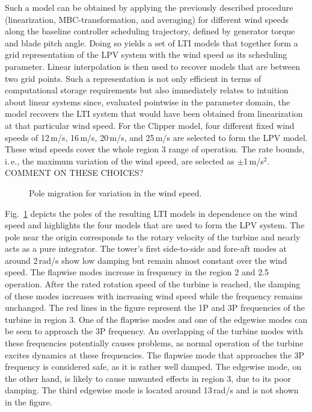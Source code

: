 \documentclass[times]{weauth}
\begin{document}


Such a model can be obtained by applying the previously described procedure (linearization, MBC-transformation, and averaging) for different wind speeds along the baseline controller scheduling trajectory, defined by generator torque and blade pitch angle.
Doing so yields a set of LTI models that together form a grid representation of the LPV system with the wind speed as its scheduling parameter. 
Linear interpolation is then used to recover models that are between two grid points.
Such a representation is not only efficient in terms of computational storage requirements but also immediately relates to intuition about linear systems since, evaluated pointwise in the parameter domain, the model recovers the LTI system that would have been obtained from linearization at that particular wind speed.   
For the Clipper model, four different fixed wind speeds of 12\,m/s, 16\,m/s, 20\,m/s, and 25\,m/s are selected to form the LPV model.
These wind speeds cover the whole region 3 range of operation.
The rate bounds, i.\,e., the maximum variation of the wind speed, are selected as $\pm$1\,m/s$^2$. COMMENT ON THESE CHOICES?


\begin{figure}[b]
	\centering
	
	\caption{Pole migration for variation in the wind speed.}
	\label{fig:pz}	
\end{figure}

Fig.~\ref{fig:pz} depicts the poles of the resulting LTI models in dependence on the wind speed and highlights the four models that are used to form the LPV system. The pole near the origin corresponds to the rotary velocity of the turbine and nearly acts as a pure integrator.
The tower's first side-to-side and fore-aft modes at around 2\,rad/s show low
damping but remain almost constant over the wind speed.
The flapwise modes increase in frequency in the region 2 and 2.5 operation.
After the rated rotation speed of the turbine is reached, the damping of these modes increases with increasing wind speed while the frequency remains unchanged.
The red lines in the figure represent the 1P and 3P frequencies of the turbine in region 3.
One of the flapwise modes and one of the edgewise modes can be seen to approach the 3P frequency.
An overlapping of the turbine modes with these frequencies potentially causes problems, as normal operation of the turbine excites dynamics at these frequencies.
The flapwise mode that approaches the 3P frequency is considered safe, as it is rather well damped.  
The  edgewise mode, on the other hand, is likely to cause unwanted effects in region 3, due to its poor damping. 
The third edgewise mode is located around 13\,rad/s and is not shown in the figure.
\end{document}
